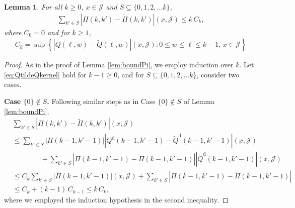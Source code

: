 \documentclass[11pt,leqno]{amsart}
\numberwithin{table}{section}
\numberwithin{figure}{section}
\numberwithin{equation}{section}
\newcommand{\1}{{\mathds{1}}}
\newcommand{\0}{\mat{0}}
\newtheorem{lemma}{Lemma}[section]
\newcommand{\tld}[1]{\widetilde{#1}}
\begin{document}
{{\begin{lemma}\label{lem:boundPiGeneral}
For all $k\ge 0$, $x\in\mathcal{J}$ and $S\subseteq \{0,1,2,\dots k\}$,
\begin{align}
\sum_{k'\in S}  \left|{{\Pi}} (k,k')-\tld{{\Pi}} (k,k')\right| (x, \mathcal{J})\le k\,C_k,\label{eq:QtildeQkernel}
\end{align}
where $C_0=0$ and for $k\ge 1$,
\begin{align}
C_k=\sup\left\{\left|{Q}(\ell,w)-\tld{{Q}}(\ell,w)\right|(x,\mathcal{J}): 0\le w\le \ell\le k-1,\,x\in \mathcal{J}\right\}
\end{align}
\end{lemma}
\begin{proof}
As in the proof of Lemma \ref{lem:boundPi}, we employ induction over $k$. Let \eqref{eq:QtildeQkernel} hold for $k-1\ge 0$, and for $S\subseteq\{0,1,2,\dots k\}$, consider two cases.

\textbf{Case $\{0\}\notin S$.} Following similar steps as in Case $\{0\}\notin S$ of Lemma \ref{lem:boundPi},
\begin{align}
&\sum_{k'\in S}\left|{{\Pi}} (k,k')-\tld{{\Pi}} (k,k')\right| (x, \mathcal{J})\nonumber\\
&\le\sum_{k'\in S} \left|  {{\Pi}}(k-1,k'-1)\right| \left|{{Q}}^{\mathrm{d}}(k-1,k'-1)-\tld{{Q}}^{\mathrm{d}}(k-1,k'-1)\right|(x,\mathcal{J})\nonumber\\
&\qquad\qquad + \sum_{k'\in S} \left| {{\Pi}}(k-1,k'-1)-\tld{{\Pi}}(k-1,k'-1)\right|\left|\tld{{Q}}^{\mathrm{d}}(k-1,k'-1)\right|(x,\mathcal{J})\nonumber\\
&\le C_{k}\sum_{k'\in S}  \left|  {{\Pi}}(k-1,k'-1)\right|(x,\mathcal{J}) + \sum_{k'\in S} \left| {{\Pi}}(k-1,k'-1)-\tld{{\Pi}}(k-1,k'-1)\right|\nonumber\\
&\le C_{k} + (k-1)\,C_{k-1}\le k\,C_k,\nonumber
\end{align}
where we employed the induction hypothesis in the second inequality.


\end{proof}}}
\end{document}
